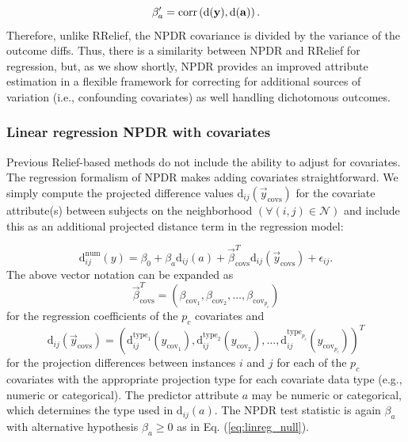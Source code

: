 \documentclass[10pt]{article}
\begin{document}
\begin{equation}
\beta'_a = \text{corr}\left( \bf{\text{d}}(\bf{y}), \bf{\text{d}}(\bf{a}) \right).
\end{equation}
Therefore, unlike RRelief, the NPDR covariance is divided by the variance of the outcome diffs. Thus, there is a similarity between NPDR and RRelief for regression, but, as we show shortly, NPDR provides an improved attribute estimation in a flexible framework for correcting for additional sources of variation (i.e., confounding covariates) as well handling dichotomous outcomes.   


\subsubsection{Linear regression NPDR with covariates}
Previous Relief-based methods do not include the ability to adjust for covariates. The regression formalism of NPDR makes adding covariates straightforward. We simply compute the projected difference values $\text{d}_{ij}(\vec{y}_{\text{covs}})$ for the covariate attribute(s) between subjects on the neighborhood $(\forall(i,j) \in \mathcal{N})$ and include this as an additional projected distance term in the regression model:

\begin{equation}\label{eq:lin_reg_cov}
    \text{d}^{\text{num}}_{ij}(y) = \beta_{0} + \beta_{a} \text{d}_{ij}(a) + \vec{\beta}^{T}_{\text{covs}}\text{d}_{ij}(\vec{y}_{\text{covs}}) + \epsilon_{ij}.
\end{equation}
The above vector notation can be expanded as  
\begin{equation}
\vec{\beta}^{T}_{\text{covs}} = \left( \beta_{\text{cov}_1}, \beta_{\text{cov}_2}, \ldots,  \beta_{\text{cov}_{p_c}} \right)
\end{equation}
for the regression coefficients of the $p_c$ covariates and 
\begin{equation}
\text{d}_{ij}(\vec{y}_\text{covs})= \left( \text{d}^{\text{type}_1}_{ij}({y}_{\text{cov}_1}), \text{d}^{\text{type}_2}_{ij}({y}_{\text{cov}_2}), \ldots, \text{d}^{\text{type}_{p_c}}_{ij}({y}_{\text{cov}_{p_c}}) \right)^{T}
\end{equation}
for the projection differences between instances $i$ and $j$ for each of the $p_c$ covariates with the appropriate projection type for each covariate data type (e.g., numeric or categorical). The predictor attribute $a$ may be numeric or categorical, which determines the type used in $\text{d}_{ij}(a)$. The NPDR test statistic is again $\beta_a$ with alternative hypothesis $\beta_a \ge 0$ as in Eq. (\ref{eq:linreg_null}). 
\end{document}
